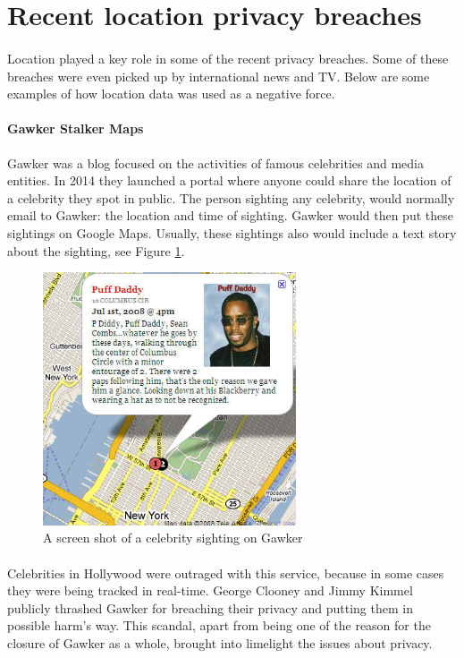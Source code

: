 \documentclass[12pt]{report}
\theoremstyle{named}
\begin{document}
\section{Recent location privacy breaches}
\paragraph{}
Location played a key role in some of the recent privacy breaches. Some of these breaches were even picked up by international news and TV. Below are some examples of how location data was used as a negative force.

\paragraph{Gawker Stalker Maps\cite{GawkerURL}} Gawker was a blog focused on the activities of famous celebrities and media entities. In 2014 they launched a portal where anyone could share the location of a celebrity they spot in public. The person sighting any celebrity, would normally email to Gawker: the location and time of sighting. Gawker would then put these sightings on Google Maps. Usually, these sightings also would include a text story about the sighting, see Figure \ref{fig:Gawker}. 

\begin{figure}[ht]
\centering
        \includegraphics[width=75mm,scale=0.5]{Images/gawker-stalker.jpg}
    \caption{A screen shot of a celebrity sighting on Gawker}
    \label{fig:Gawker}
\end{figure}
\paragraph{}
Celebrities in Hollywood were outraged with this service, because in some cases they were being tracked in real-time. George Clooney and Jimmy Kimmel publicly thrashed Gawker for breaching their privacy and putting them in possible harm's way. This scandal, apart from being one of the reason for the closure of Gawker as a whole, brought into limelight the issues about privacy.
\end{document}
